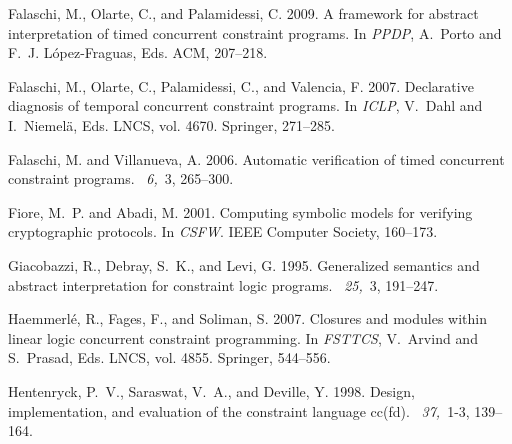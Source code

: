 \documentclass{tlp}
\begin{document}
\begin{thebibliography}{}
{\sc Falaschi, M.}, {\sc Olarte, C.}, {\sc and} {\sc Palamidessi, C.} 2009.
\newblock A framework for abstract interpretation of timed concurrent
  constraint programs.
\newblock In {\em PPDP}, {A.~Porto} {and} {F.~J. L{\'o}pez-Fraguas}, Eds. ACM,
  207--218.

{\sc Falaschi, M.}, {\sc Olarte, C.}, {\sc Palamidessi, C.}, {\sc and} {\sc
  Valencia, F.} 2007.
\newblock Declarative diagnosis of temporal concurrent constraint programs.
\newblock In {\em ICLP}, {V.~Dahl} {and} {I.~Niemel{\"a}}, Eds. LNCS, vol.
  4670. Springer, 271--285.

{\sc Falaschi, M.} {\sc and} {\sc Villanueva, A.} 2006.
\newblock Automatic verification of timed concurrent constraint programs.
~{\em 6,\/}~3, 265--300.

{\sc Fiore, M.~P.} {\sc and} {\sc Abadi, M.} 2001.
\newblock Computing symbolic models for verifying cryptographic protocols.
\newblock In {\em CSFW}. IEEE Computer Society, 160--173.

{\sc Giacobazzi, R.}, {\sc Debray, S.~K.}, {\sc and} {\sc Levi, G.} 1995.
\newblock Generalized semantics and abstract interpretation for constraint
  logic programs.
~{\em 25,\/}~3, 191--247.

{\sc Haemmerl{\'e}, R.}, {\sc Fages, F.}, {\sc and} {\sc Soliman, S.} 2007.
\newblock Closures and modules within linear logic concurrent constraint
  programming.
\newblock In {\em FSTTCS}, {V.~Arvind} {and} {S.~Prasad}, Eds. LNCS, vol. 4855.
  Springer, 544--556.

{\sc Hentenryck, P.~V.}, {\sc Saraswat, V.~A.}, {\sc and} {\sc Deville, Y.}
  1998.
\newblock Design, implementation, and evaluation of the constraint language
  cc(fd).
~{\em 37,\/}~1-3, 139--164.


\end{thebibliography}
\end{document}
